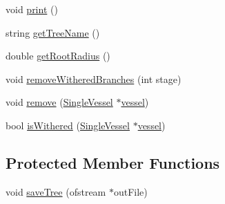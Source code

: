 \begin{DoxyCompactItemize}
\item 
void \hyperlink{class_single_vessel_c_c_o_o_tree_acc5c5d57cad07202170ecca7f65978cf}{print} ()
\item 
string \hyperlink{class_single_vessel_c_c_o_o_tree_a6aeccd994eeaa106d0c269313d7cf3dc}{get\+Tree\+Name} ()
\item 
double \hyperlink{class_single_vessel_c_c_o_o_tree_a2736be9eef11a5b1e8f45218a8933d84}{get\+Root\+Radius} ()
\item 
void \hyperlink{class_single_vessel_c_c_o_o_tree_a0a3ffdee4f53e21209a187b9539f41ec}{remove\+Withered\+Branches} (int stage)
\item 
void \hyperlink{class_single_vessel_c_c_o_o_tree_a8f8c3457c301d6d8f91ac4ff1a5c2de5}{remove} (\hyperlink{class_single_vessel}{Single\+Vessel} $\ast$\hyperlink{structvessel}{vessel})
\item 
bool \hyperlink{class_single_vessel_c_c_o_o_tree_a9e1b432708271e41cd9a3438d2f2fe44}{is\+Withered} (\hyperlink{class_single_vessel}{Single\+Vessel} $\ast$\hyperlink{structvessel}{vessel})
\end{DoxyCompactItemize}
\subsection*{Protected Member Functions}
\begin{DoxyCompactItemize}
\item 
void \hyperlink{class_single_vessel_c_c_o_o_tree_a4f5ae33e49f3d7ba07e1f4a31ff3568e}{save\+Tree} (ofstream $\ast$out\+File)
\end{DoxyCompactItemize}
